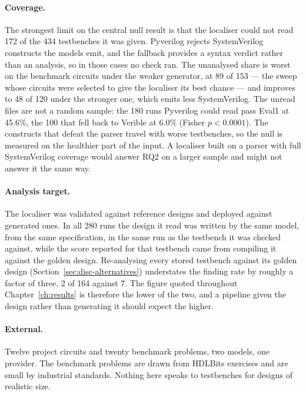 \documentclass[11pt,a4paper,titlepage=false]{scrreprt}
\begin{document}
\paragraph{Coverage.} The strongest limit on the central null result is that the localiser
could not read 172 of the 434 testbenches it was given. Pyverilog rejects SystemVerilog
constructs the models emit, and the fallback provides a syntax verdict rather than an
analysis, so in those cases no check ran. The unanalysed share is worst on the benchmark
circuits under the weaker generator, at 89 of 153 --- the sweep whose circuits were selected
to give the localiser its best chance --- and improves to 48 of 120 under the stronger one,
which emits less SystemVerilog. The unread files are not a random sample: the 180 runs
Pyverilog could read pass Eval1 at 45.6\%, the 100 that fell back to Verible at 6.0\% (Fisher
$p<0.0001$). The constructs that defeat the parser travel with worse testbenches, so the null
is measured on the healthier part of the input. A localiser built on a parser with full
SystemVerilog coverage would answer RQ2 on a larger sample and might not answer it the same
way.

\paragraph{Analysis target.} The localiser was validated against reference designs and
deployed against generated ones. In all 280 runs the design it read was written by the same
model, from the same specification, in the same run as the testbench it was checked against,
while the score reported for that testbench came from compiling it against the golden design.
Re-analysing every stored testbench against its golden design
(Section~\ref{sec:disc-alternatives}) understates the finding rate by roughly a factor of
three, 2 of 164 against 7. The figure quoted throughout Chapter~\ref{ch:results} is therefore
the lower of the two, and a pipeline given the design rather than generating it should expect
the higher.

\paragraph{External.} Twelve project circuits and twenty benchmark problems, two models,
one provider. The benchmark problems are drawn from HDLBits exercises and are small by
industrial standards. Nothing here speaks to testbenches for designs of realistic size.
\end{document}
